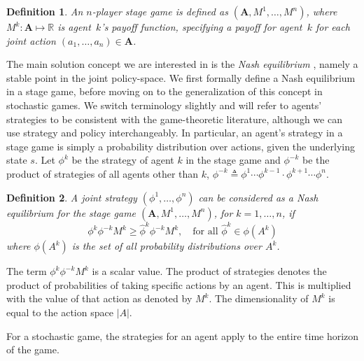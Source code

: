 \documentclass[jair, twoside,11pt,theapa]{article}
\newtheorem{defn}{Definition}
\begin{document}
\begin{defn}\label{def:stagegame}
    An $n$-player stage game is defined as $(\mathbf{A}, M^1, \ldots, M^n)$, where $M^k:\mathbf{A}\mapsto \mathbb{R}$ is agent~$k$'s payoff function, specifying a payoff for agent~$k$ for each joint action $(a_1,\ldots, a_n)\in\mathbf{A}$.
\end{defn}


The main solution concept we are interested in is the \emph{Nash equilibrium} \citep{nash20167}, namely a stable point in the joint policy-space. We first formally define a Nash equilibrium in a stage game, before moving on to the generalization of this concept in stochastic games. We switch terminology slightly and will refer to agents' strategies to be consistent with the game-theoretic literature, although we can use strategy and policy interchangeably. In particular, an agent's strategy in a stage game is simply a probability distribution over actions, given the underlying state $s$. 
Let $\phi^k$ be the strategy of agent $k$ in the stage game and $\phi^{-k}$ be the product of strategies of all agents other than $k$, $\phi^{-k} \triangleq \phi^1 \cdots \phi^{k-1} \cdot \phi^{k+1} \cdots \phi^n$.

\begin{defn}\label{def:nasheqstagegame}
    A joint strategy $(\phi^1, \ldots, \phi^n)$ can be considered as a Nash equilibrium for the stage game $(\mathbf{A}, M^1, \ldots, M^n)$, for $k = 1, \ldots, n$, if 
    \begin{equation}
        \phi^k \phi^{-k} M^k \geq \hat{\phi}^k \phi^{-k} M^k, \quad \textrm{for all } \hat{\phi}^k \in \phi(A^k)
    \end{equation}
    where $\phi(A^k)$ is the set of all probability distributions over $A^k$.
\end{defn}


\noindent The term $\phi^k \phi^{-k} M^k $ is a scalar value. The product of strategies denotes the product of probabilities of taking specific actions by an agent. This is multiplied with the value of that action as denoted by $M^k$. The dimensionality of $M^k$ is equal to the action space $|A|$. 

For a stochastic game, the strategies for an agent apply to the entire time horizon of the game.
\end{document}
